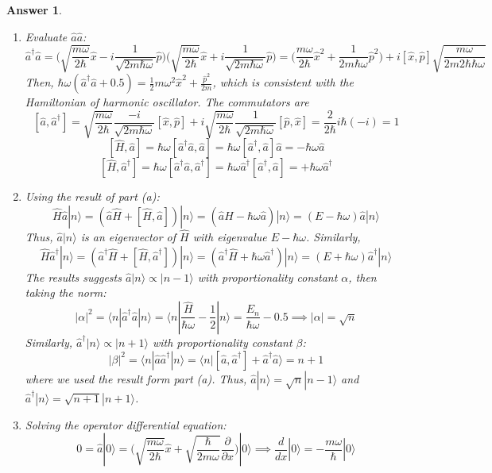 \documentclass[a4paper]{article}
\newtheorem{ans}{Answer}[subsection]
\theoremstyle{new}
\begin{document}
\begin{ans}\leavevmode
\begin{enumerate}[label=(\alph*)]
\item Evaluate $\hat{a}\hat{a}$:
$$\hat{a}^\dag\hat{a}=\bigg(\sqrt{\frac{m\omega}{2\hbar}}\hat{x}-i\frac{1}{\sqrt{2m\hbar\omega}}\hat{p}\bigg)\bigg(\sqrt{\frac{m\omega}{2\hbar}}\hat{x}+i\frac{1}{\sqrt{2m\hbar\omega}}\hat{p}\bigg)=\bigg(\frac{m\omega}{2\hbar}\hat{x}^2+\frac{1}{2m\hbar\omega}\hat{p}^2\bigg)+i[\hat{x},\hat{p}]\sqrt{\frac{m\omega}{2m2\hbar\hbar\omega}}$$
Then, $\hbar\omega(\hat{a}^\dag\hat{a}+0.5)=\frac{1}{2}m\omega^2\hat{x}^2+\frac{\hat{p}^2}{2m}$, which is consistent with the Hamiltonian of harmonic oscillator. The commutators are
$$[\hat{a},\hat{a}^\dag]=\sqrt{\frac{m\omega}{2\hbar}}\frac{-i}{\sqrt{2m\hbar\omega}}[\hat{x},\hat{p}]+i\sqrt{\frac{m\omega}{2\hbar}}\frac{1}{\sqrt{2m\hbar\omega}}[\hat{p},\hat{x}]=\frac{2}{2\hbar}i\hbar(-i)=1$$
$$[\hat{H},\hat{a}]=\hbar\omega[\hat{a}^\dag\hat{a},\hat{a}]=\hbar\omega[\hat{a}^\dag,\hat{a}]\hat{a}=-\hbar\omega\hat{a}$$
$$[\hat{H},\hat{a}^\dag]=\hbar\omega[\hat{a}^\dag\hat{a},\hat{a}^\dag]=\hbar\omega\hat{a}^\dag[\hat{a}^\dag,\hat{a}]=+\hbar\omega\hat{a}^\dag$$
\item Using the result of part (a):
$$\hat{H}\hat{a}|n\rangle=(\hat{a}\hat{H}+[\hat{H},\hat{a}])|n\rangle=(\hat{a}\hat{H}-\hbar\omega\hat{a})|n\rangle=(E-\hbar\omega)\hat{a}|n\rangle$$
Thus, $\hat{a}|n\rangle$ is an eigenvector of $\hat{H}$ with eigenvalue $E-\hbar\omega$. Similarly,
$$\hat{H}\hat{a}^\dag|n\rangle=(\hat{a}^\dag\hat{H}+[\hat{H},\hat{a}^\dag])|n\rangle=(\hat{a}^\dag\hat{H}+\hbar\omega\hat{a}^\dag)|n\rangle=(E+\hbar\omega)\hat{a}^\dag |n\rangle$$
The results suggests $\hat{a}|n\rangle\propto|n-1\rangle$ with proportionality constant $\alpha$, then taking the norm:
$$|\alpha|^2=\langle n|\hat{a}^\dag\hat{a}|n\rangle=\langle n|\frac{\hat{H}}{\hbar\omega}-\frac{1}{2}|n\rangle=\frac{E_n}{\hbar\omega}-0.5\implies|\alpha|=\sqrt{n}$$
Similarly, $\hat{a}^\dag|n\rangle\propto|n+1\rangle$ with proportionality constant $\beta$:
$$|\beta|^2=\langle n|\hat{a}\hat{a}^\dag|n\rangle=\langle n|[\hat{a},\hat{a}^\dag]+\hat{a}^\dag\hat{a}\rangle=n+1$$
where we used the result form part (a). Thus, $\hat{a}|n\rangle=\sqrt{n}|n-1\rangle$ and $\hat{a}^\dag|n\rangle=\sqrt{n+1}|n+1\rangle$.
\newpage
\item Solving the operator differential equation:
$$0=\hat{a}|0\rangle=\bigg(\sqrt{\frac{m\omega}{2\hbar}}\hat{x}+\sqrt{\frac{\hbar}{2m\omega}}\frac{\partial}{\partial x}\bigg)|0\rangle\implies\frac{d}{dx}|0\rangle=-\frac{m\omega}{\hbar}|0\rangle$$

\end{enumerate}
\end{ans}
\end{document}
